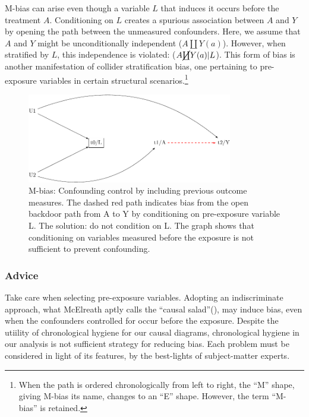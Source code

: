\documentclass[
  singlecolumn,
  9pt]{article}
\begin{document}
M-bias can arise even though a variable \(L\) that induces it occurs
before the treatment \(A\). Conditioning on \(L\) creates a spurious
association between \(A\) and \(Y\) by opening the path between the
unmeasured confounders. Here, we assume that \(A\) and \(Y\) might be
unconditionally independent (\(A \coprod Y(a)\)). However, when
stratified by \(L\), this independence is violated:
(\(A \cancel{\coprod} Y(a)| L\)). This form of bias is another
manifestation of collider stratification bias, one pertaining to
pre-exposure variables in certain structural scenarios.\footnote{When
  the path is ordered chronologically from left to right, the ``M''
  shape, giving M-bias its name, changes to an ``E'' shape. However, the
  term ``M-bias'' is retained.}

\begin{figure}

{\centering \includegraphics[width=0.8\textwidth,height=\textheight]{causal-dags_files/figure-pdf/fig-m-bias-1.pdf}

}

\caption{\label{fig-m-bias}M-bias: Confounding control by including
previous outcome measures. The dashed red path indicates bias from the
open backdoor path from A to Y by conditioning on pre-exposure variable
L. The solution: do not condition on L. The graph shows that
conditioning on variables measured before the exposure is not sufficient
to prevent confounding.}

\end{figure}

\subsubsection{Advice}\label{advice}

Take care when selecting pre-exposure variables. Adopting an
indiscriminate approach, what McElreath aptly calls the ``causal
salad''(), may induce bias,
even when the confounders controlled for occur before the exposure.
Despite the utiility of chronological hygiene for our causal diagrams,
chronological hygiene in our analysis is not sufficient strategy for
reducing bias. Each problem must be considered in light of its features,
by the best-lights of subject-matter experts.
\end{document}
